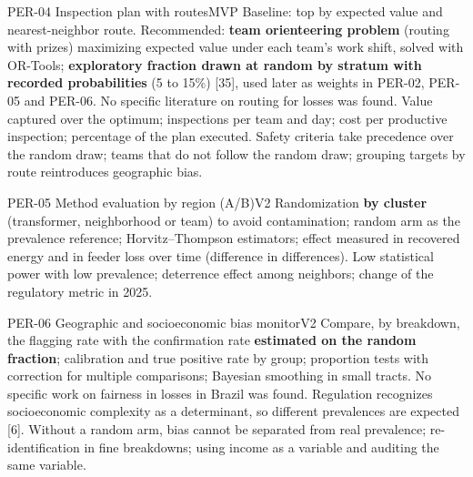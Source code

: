 \begin{ficha}{PER-04 \textperiodcentered{} Inspection plan with routes}{MVP}
 Baseline: top by expected value and nearest-neighbor
route. Recommended: \textbf{team orienteering problem} (routing with
prizes) maximizing expected value under each team's work shift, solved
with OR-Tools; \textbf{exploratory fraction drawn at random by stratum with
recorded probabilities} (5 to 15\%) [35], used later as weights in
PER-02, PER-05 and PER-06. No specific literature on
routing for losses was found.
 Value captured over the optimum; inspections per team and day;
cost per productive inspection; percentage of the plan executed.
 Safety criteria take precedence over the random draw;
teams that do not follow the random draw; grouping targets by route reintroduces geographic bias.
\end{ficha}

\begin{ficha}{PER-05 \textperiodcentered{} Method evaluation by region (A/B)}{V2}
 Randomization \textbf{by cluster} (transformer, neighborhood
or team) to avoid contamination; random arm as the prevalence
reference; Horvitz--Thompson estimators; effect measured in recovered
energy and in feeder loss over time (difference in
differences).
 Low statistical power with low prevalence; deterrence
effect among neighbors; change of the regulatory metric in 2025.
\end{ficha}

\begin{ficha}{PER-06 \textperiodcentered{} Geographic and socioeconomic bias monitor}{V2}
 Compare, by breakdown, the flagging rate with the
confirmation rate \textbf{estimated on the random fraction}; calibration and true
positive rate by group; proportion tests with correction for
multiple comparisons; Bayesian smoothing in small tracts. No
specific work on fairness in losses in Brazil was found.
Regulation recognizes socioeconomic complexity as a determinant, so
different prevalences are expected [6].
 Without a random arm, bias cannot be separated from real
prevalence; re-identification in fine breakdowns; using income as a variable and auditing
the same variable.
\end{ficha}

